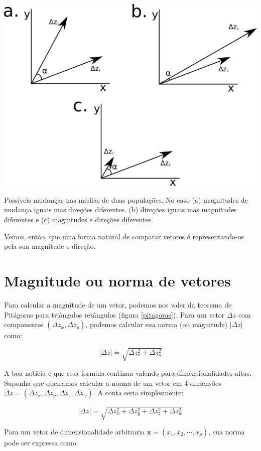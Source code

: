 \documentclass[portuges,]{tufte-handout}
\begin{document}
\begin{marginfigure}
\includegraphics{./figuras/deltazes.png}
\caption{Possíveis mudanças nas médias de duas populações. No
caso (a) magnitudes de mudança iguais mas direções diferentes. (b)
direções iguais mas magnitudes diferentes e (c) magnitudes e direções
diferentes.}
\label{deltazes}
\end{marginfigure}

Vemos, então, que uma forma natural de comparar vetores é
representando-os pela sua magnitude e direção.

\section{Magnitude ou norma de
vetores}\label{magnitude-ou-norma-de-vetores}

Para calcular a magnitude de um vetor, podemos nos valer da teorema de
Pitágoras para triângulos retângulos (figura \ref{pitagoras}). Para um
vetor \(\Delta z\) com componentes \((\Delta z_x, \Delta z_y)\), podemos
calcular sua norma (ou magnitude) \(|\Delta z|\) como:

\[
|\Delta z| = \sqrt{\Delta z_x^2 + \Delta z_y^2}
\]

A boa notícia é que essa formula continua valendo para dimensionalidades
altas. Suponha que queiramos calcular a norma de um vetor em 4 dimensões
\(\Delta z = (\Delta z_x, \Delta z_y, \Delta z_z, \Delta z_w)\). A conta
seria simplesmente:

\[
|\Delta z| = \sqrt{\Delta z_x^2 + \Delta z_y^2+ \Delta z_z^2 + \Delta z_w^2}
\]

Para um vetor de dimensionalidade arbitraria
\(\mathbf{x} = (x_1, x_2, \cdots, x_p)\), sua norma pode ser expressa
como:
\end{document}
